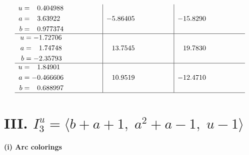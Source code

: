 \documentclass[1p]{elsarticle_modified}
\theoremstyle{definition}
\begin{document}
$$\begin{array}{c|c|c}
\begin{aligned}
u &= \phantom{-}0.404988\phantom{ +0.000000I} \\
a &= \phantom{-}3.63922\phantom{ +0.000000I} \\
b &= \phantom{-}0.977374\phantom{ +0.000000I}\end{aligned}
 & -5.86405\phantom{ +0.000000I} & -15.8290\phantom{ +0.000000I} \\ \hline\begin{aligned}
u &= -1.72706\phantom{ +0.000000I} \\
a &= \phantom{-}1.74748\phantom{ +0.000000I} \\
b &= -2.35793\phantom{ +0.000000I}\end{aligned}
 & \phantom{-}13.7545\phantom{ +0.000000I} & \phantom{-}19.7830\phantom{ +0.000000I} \\ \hline\begin{aligned}
u &= \phantom{-}1.84901\phantom{ +0.000000I} \\
a &= -0.466606\phantom{ +0.000000I} \\
b &= \phantom{-}0.688997\phantom{ +0.000000I}\end{aligned}
 & \phantom{-}10.9519\phantom{ +0.000000I} & -12.4710\phantom{ +0.000000I}\\
 \hline 
 \end{array}$$\newpage\newpage\renewcommand{\arraystretch}{1}
\centering \section*{III. $I^u_{3}= \langle b+a+1,\;a^2+a-1,\;u-1 \rangle$}
\flushleft \textbf{(i) Arc colorings}\\
\end{document}
